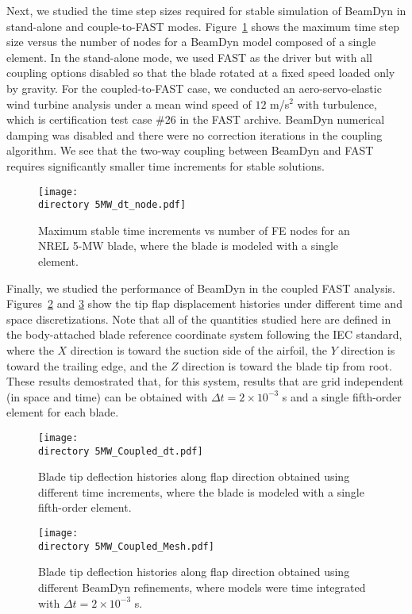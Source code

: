 \documentclass{aiaa-tc}
\def\directory{EPSF/}
\begin{document}
Next, we studied the time step sizes required for stable simulation of BeamDyn in stand-alone and couple-to-FAST modes. Figure~\ref{fig:5MWdt_node} shows the maximum time step size versus the number of nodes for a BeamDyn model composed of a single element. In the stand-alone mode, we used FAST as the driver but with all coupling options disabled so that the blade rotated at a fixed speed loaded only by gravity. For the coupled-to-FAST case, we conducted an aero-servo-elastic wind turbine analysis under a mean wind speed of $12$ m/s$^2$ with turbulence, which is  certification test case \#26 in the FAST archive.  BeamDyn numerical damping was disabled and there were no correction iterations in the coupling algorithm.  We see that the two-way coupling between BeamDyn and FAST requires significantly smaller time increments for stable solutions.

\begin{figure}
    \centering
\texttt{[image: \\directory  5MW\_dt\_node.pdf]}
\caption{Maximum stable time increments vs number of FE nodes for an NREL 5-MW blade, where the blade is modeled with a single element.}
\label{fig:5MWdt_node}
\end{figure} 

Finally, we studied the performance of BeamDyn in the coupled FAST analysis. Figures~\ref{fig:5MW_Coupled_dt} and \ref{fig:5MW_Coupled_Mesh} show the tip flap displacement histories under different time and space discretizations. Note that all of the quantities studied here are defined in the body-attached blade reference coordinate system following the IEC standard, where the $X$ direction is toward the suction side of the airfoil, the $Y$ direction is toward the trailing edge, and the $Z$ direction is toward the blade tip from root. These results demostrated that, for this system, results that are grid independent (in space and time) can be obtained with $\Delta t = 2 \times 10^{-3}$ s  and a single fifth-order element for each blade.  

\begin{figure}
    \centering
\texttt{[image: \\directory  5MW\_Coupled\_dt.pdf]}
\caption{Blade tip deflection histories along flap direction obtained using different time increments, where the blade is modeled with a single fifth-order element.}
\label{fig:5MW_Coupled_dt}
\end{figure} 

\begin{figure}
    \centering
\texttt{[image: \\directory  5MW\_Coupled\_Mesh.pdf]}
\caption{Blade tip deflection histories along flap direction obtained using different BeamDyn refinements, where models were time integrated with $\Delta t = 2 \times 10^{-3}$ s.}
\label{fig:5MW_Coupled_Mesh}
\end{figure} 
\end{document}
